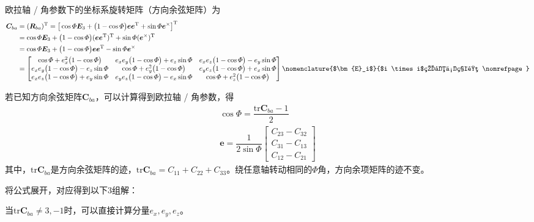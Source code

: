 {
	欧拉轴 / 角参数下的坐标系旋转矩阵（方向余弦矩阵）为
	\begin{align}
		\bm{C}_{ba} & = (\bm{R}_{ba})^\T 
		= \big[\cos \varPhi \bm{E}_3 + \big( 1 - \cos \varPhi \big) \bm{e} \bm{e}^\T + \sin \varPhi \bm{e}^{\times}\big]^\T \notag \\
		& = \cos \varPhi \bm{E}_3 + \big( 1 - \cos \varPhi \big) (\bm{e} \bm{e}^\T)^\T + \sin \varPhi (\bm{e}^{\times})^\T \notag \\
		& = \cos \varPhi \bm{E}_3 + \big( 1 - \cos \varPhi \big) \bm{e} \bm{e}^\T - \sin \varPhi \bm{e}^\times \\
		& = 
		\begin{bmatrix}
			\cos \varPhi + e_x^2 \big( 1 - \cos \varPhi \big) & e_x e_y \big( 1 - \cos \varPhi \big) + e_z \sin \varPhi & e_x e_z \big( 1 - \cos \varPhi \big) - e_y \sin \varPhi \\
			e_x e_y \big( 1 - \cos \varPhi \big) - e_z \sin \varPhi & \cos \varPhi + e_y^2 \big( 1 - \cos \varPhi \big) & e_y e_z \big(1 - \cos \varPhi \big) + e_x \sin \varPhi \\
			e_x e_z \big( 1 - \cos \varPhi \big) + e_y \sin \varPhi & e_y e_z \big( 1- \cos \varPhi \big) - e_x \sin \varPhi & \cos \varPhi + e_z^2 \big( 1- \cos \varPhi \big)
		\end{bmatrix}
		\nomenclature{$\bm{E}_i$}{$i \times i$的单位矩阵 \nomrefpage}
	\end{align}
}



若已知方向余弦矩阵$\bm{C}_{ba}$，可以计算得到欧拉轴 / 角参数，得
\begin{align}
	\cos \varPhi = \dfrac{\text{tr} \bm{C}_{ba} - 1}{2} \\
	\bm{e} = \dfrac{1}{2 \sin \varPhi} 
	\begin{bmatrix}
		C_{23} - C_{32} \\
		C_{31} - C_{13} \\
		C_{12} - C_{21}
	\end{bmatrix}
\end{align}
其中，$\text{tr} \bm{C}_{ba}$是方向余弦矩阵的迹，$\text{tr} \bm{C}_{ba} = C_{11} + C_{22} + C_{33}$。绕任意轴转动相同的$\varPhi$角，方向余项矩阵的迹不变。

\noindent 将公式展开，对应得到以下3组解：

\noa[1] 当$\text{tr} \bm{C}_{ba} \neq 3, -1$时，可以直接计算分量$e_x, e_y, e_z$。

